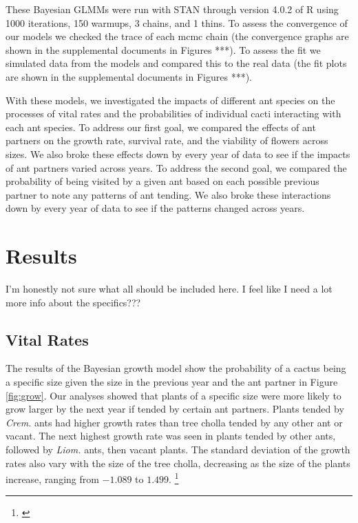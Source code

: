 \documentclass[12pt,a4paper]{article}
\newcommand{\ali}[2]{{\color{pink}{#1}}\footnote{\textit{\color{pink}{#2}}}}
\begin{document}
		These Bayesian GLMMs were run with STAN through version 4.0.2  of R using 1000 iterations, 150 warmups, 3 chains, and 1 thins. 
		To assess the convergence of our models we checked the trace of each mcmc chain (the convergence graphs are shown in the supplemental documents in Figures ***).
		To assess the fit we simulated data from the models and compared this to the real data (the fit plots are shown in the supplemental documents in Figures ***).
		
		With these models, we investigated the impacts of different ant species on the processes of vital rates and the probabilities of individual cacti interacting with each ant species.
		To address our first goal, we compared the effects of ant partners on the growth rate, survival rate, and the viability of flowers across sizes. 
		We also broke these effects down by every year of data to see if the impacts of ant partners varied across years. 
		To address the second goal, we compared the probability of being visited by a given ant based on each possible previous partner to note any patterns of ant tending. 
		We also broke these interactions down by every year of data to see if the patterns changed across years. 
		
		\vspace{1cm}
		
		
		\section*{Results}
		I’m honestly not sure what all should be included here. I feel like I need a lot more info about the specifics???
		
		\subsection*{Vital Rates}
		The results of the Bayesian growth model show the probability of a cactus being a specific size given the size in the previous year and the ant partner in Figure \ref{fig:grow}.
		Our analyses showed that plants of a specific size were more likely to grow larger by the next year if tended by certain ant partners. 
		Plants tended by \textit{Crem.} ants had higher growth rates than tree cholla tended by any other ant or vacant. 
		The next highest growth rate was seen in plants tended by other ants, followed by \textit{Liom.} ants, then vacant plants. 
		The standard deviation of the growth rates also vary with the size of the tree cholla, decreasing as the size of the plants increase, ranging from $-1.089$ to $1.499$.
		\ali{ }{I’m really unsure about what else I should say about this. }
		
\end{document}
